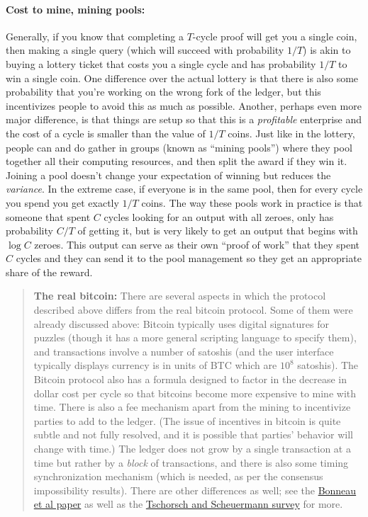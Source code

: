 \paragraph{Cost to mine, mining pools:} Generally, if you know that
completing a \(T\)-cycle proof will get you a single coin, then making a
single query (which will succeed with probability \(1/T\)) is akin to
buying a lottery ticket that costs you a single cycle and has
probability \(1/T\) to win a single coin. One difference over the actual
lottery is that there is also some probability that you're working on
the wrong fork of the ledger, but this incentivizes people to avoid this
as much as possible. Another, perhaps even more major difference, is
that things are setup so that this is a \emph{profitable} enterprise and
the cost of a cycle is smaller than the value of \(1/T\) coins. Just
like in the lottery, people can and do gather in groups (known as
``mining pools'') where they pool together all their computing
resources, and then split the award if they win it. Joining a pool
doesn't change your expectation of winning but reduces the
\emph{variance}. In the extreme case, if everyone is in the same pool,
then for every cycle you spend you get exactly \(1/T\) coins. The way
these pools work in practice is that someone that spent \(C\) cycles
looking for an output with all zeroes, only has probability \(C/T\) of
getting it, but is very likely to get an output that begins with
\(\log C\) zeroes. This output can serve as their own ``proof of work''
that they spent \(C\) cycles and they can send it to the pool management
so they get an appropriate share of the reward.

\begin{quote}
\textbf{The real bitcoin:} There are several aspects in which the
protocol described above differs from the real bitcoin protocol. Some of
them were already discussed above: Bitcoin typically uses digital
signatures for puzzles (though it has a more general scripting language
to specify them), and transactions involve a number of satoshis (and the
user interface typically displays currency is in units of BTC which are
\(10^8\) satoshis). The Bitcoin protocol also has a formula designed to
factor in the decrease in dollar cost per cycle so that bitcoins become
more expensive to mine with time. There is also a fee mechanism apart
from the mining to incentivize parties to add to the ledger. (The issue
of incentives in bitcoin is quite subtle and not fully resolved, and it
is possible that parties' behavior will change with time.) The ledger
does not grow by a single transaction at a time but rather by a
\emph{block} of transactions, and there is also some timing
synchronization mechanism (which is needed, as per the consensus
impossibility results). There are other differences as well; see the
\href{https://eprint.iacr.org/2015/261}{Bonneau et al paper} as well as
the \href{https://eprint.iacr.org/2015/464}{Tschorsch and Scheuermann
survey} for more.
\end{quote}

